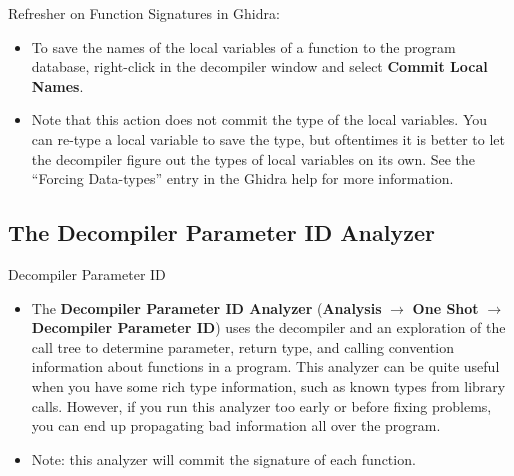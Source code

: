 \documentclass{beamer}
\begin{document}
\begin{frame}
\begin{block}{Refresher on Function Signatures in Ghidra:}
\begin{itemize}
\item To save the names of the local variables of a function to the program database, right-click in the decompiler window and select \textbf{Commit Local Names}. 
\item Note that this action does not commit the type of the local variables. You can re-type a local variable to save the type, but oftentimes it is better to let
the decompiler figure out the types of local variables on its own.  See the ``Forcing Data-types'' entry in the Ghidra help for more information. 

\end{itemize}
\end{block}
\end{frame}



\subsection{The Decompiler Parameter ID Analyzer}
\begin{frame}
\begin{block}{Decompiler Parameter ID}
\begin{itemize}
\item The \textbf{Decompiler Parameter ID Analyzer} (\textbf{Analysis} $\rightarrow$ \textbf{One Shot} $\rightarrow$ \textbf{Decompiler Parameter ID}) uses the decompiler and an
exploration of the call tree to determine parameter, return type, and calling convention information about functions in a program.  This analyzer can be quite useful when 
you have some rich type information, such as known types from library calls.  However, if you run this analyzer too early or before fixing problems, you can end up propagating 
bad information all over the program.
\item Note: this analyzer will commit the signature of each function.
\end{itemize}
\end{block}
\end{frame}
\end{document}
